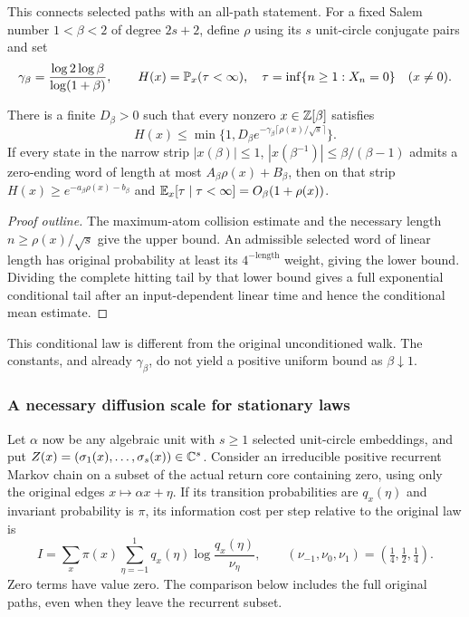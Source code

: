 This connects selected paths with an all-path statement.
For a fixed Salem number $1<\beta<2$ of degree $2s+2$, define $\rho$ using its $s$ unit-circle conjugate pairs and set
\[
 \gamma_\beta=\frac{\log2\log\beta}{\log(1+\beta)},\qquad
 H(x)=\mathbb P_x(\tau<\infty),\quad
 \tau=\inf\{n\ge1:X_n=0\}\quad(x\ne0).
\]
\begin{proposition}\label{ret:hitting-rate}
There is a finite $D_\beta>0$ such that every nonzero $x\in\mathbb Z[\beta]$ satisfies
\begin{equation}\label{ret:hitting}
 H(x)\le\min\{1,D_\beta
           e^{-\gamma_\beta\lceil\rho(x)/\sqrt{s}\rceil}\}.
\end{equation}
If every state in the narrow strip $|x(\beta)|\le1$, $|x(\beta^{-1})|\le\beta/(\beta-1)$ admits a zero-ending word of length at most $A_\beta\rho(x)+B_\beta$, then on that strip $H(x)\ge e^{-a_\beta\rho(x)-b_\beta}$ and $\mathbb E_x[\tau\mid\tau<\infty]=O_\beta(1+\rho(x))$.
\end{proposition}
\begin{proof}[Proof outline]
The maximum-atom collision estimate and the necessary length $n\ge\rho(x)/\sqrt{s}$ give the upper bound.
An admissible selected word of linear length has original probability at least its $4^{-\text{length}}$ weight, giving the lower bound.
Dividing the complete hitting tail by that lower bound gives a full exponential conditional tail after an input-dependent linear time and hence the conditional mean estimate.
\end{proof}
This conditional law is different from the original unconditioned walk.
The constants, and already $\gamma_\beta$, do not yield a positive uniform bound as $\beta\downarrow1$.

\subsubsection{A necessary diffusion scale for stationary laws}
\label{ret:small-ball}

Let $\alpha$ now be any algebraic unit with $s\ge1$ selected unit-circle embeddings, and put $Z(x)=(\sigma_1(x),\ldots,\sigma_s(x))\in\mathbb C^s$.
Consider an irreducible positive recurrent Markov chain on a subset of the actual return core containing zero, using only the original edges $x\mapsto\alpha x+\eta$.
If its transition probabilities are $q_x(\eta)$ and invariant probability is $\pi$, its information cost per step relative to the original law is
\[
 I=\sum_x\pi(x)\sum_{\eta=-1}^1q_x(\eta)
           \log\frac{q_x(\eta)}{\nu_\eta},
 \qquad(\nu_{-1},\nu_0,\nu_1)=(\tfrac14,\tfrac12,\tfrac14).
\]
Zero terms have value zero.
The comparison below includes the full original paths, even when they leave the recurrent subset.

